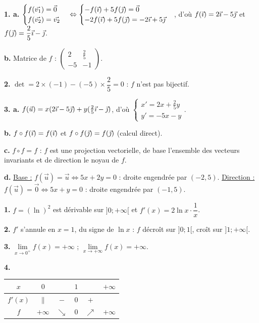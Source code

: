 \documentclass[11pt]{article}
\begin{document}
\textbf{1. a.} $\begin{cases} f(\vec{v_1}) = \vec{0} \\ f(\vec{v_2}) = \vec{v_2} \end{cases} \Leftrightarrow \begin{cases} -f(\vec{\imath}) + 5f(\vec{\jmath}) = \vec{0} \\ -2f(\vec{\imath}) + 5f(\vec{\jmath}) = -2\vec{\imath} + 5\vec{\jmath} \end{cases}$, d'où $f(\vec{\imath}) = 2\vec{\imath} - 5\vec{\jmath}$ et $f(\vec{\jmath}) = \dfrac{2}{5}\vec{\imath} - \vec{\jmath}$.

\textbf{b.} Matrice de $f$ : $\begin{pmatrix} 2 & \frac{2}{5} \\ -5 & -1 \end{pmatrix}$.

\textbf{2.} $\det = 2\times(-1) - (-5)\times\dfrac{2}{5} = 0$ : $f$ n'est pas bijectif.

\textbf{3. a.} $f(\vec{u}) = x(2\vec{\imath} - 5\vec{\jmath}) + y(\tfrac{2}{5}\vec{\imath} - \vec{\jmath})$, d'où $\begin{cases} x' = 2x + \frac{2}{5}y \\ y' = -5x - y \end{cases}$.

\textbf{b.} $f\circ f(\vec{\imath}) = f(\vec{\imath})$ et $f\circ f(\vec{\jmath}) = f(\vec{\jmath})$ (calcul direct).

\textbf{c.} $f\circ f = f$ : $f$ est une projection vectorielle, de base l'ensemble des vecteurs invariants et de direction le noyau de $f$.

\textbf{d.} \underline{Base :} $f(\vec{u}) = \vec{u} \Leftrightarrow 5x + 2y = 0$ : droite engendrée par $(-2, 5)$. \underline{Direction :} $f(\vec{u}) = \vec{0} \Leftrightarrow 5x + y = 0$ : droite engendrée par $(-1, 5)$.

\textbf{1.} $f = (\ln)^2$ est dérivable sur $]0;+\infty[$ et $f'(x) = 2\ln x\cdot\dfrac{1}{x}$.

\textbf{2.} $f'$ s'annule en $x = 1$, du signe de $\ln x$ : $f$ décroît sur $]0;1[$, croît sur $]1;+\infty[$.

\textbf{3.} $\lim\limits_{x\to 0^+} f(x) = +\infty$ ; $\lim\limits_{x\to+\infty} f(x) = +\infty$.

\textbf{4.}
\begin{center}\renewcommand{\arraystretch}{1.4}
\begin{tabular}{|c|ccccc|}
\hline $x$ & $0$ & & $1$ & & $+\infty$ \\\hline $f'(x)$ & $\|$ & $-$ & $0$ & $+$ & \\\hline $f$ & $+\infty$ & $\searrow$ & $0$ & $\nearrow$ & $+\infty$ \\\hline
\end{tabular}
\end{center}
\end{document}
